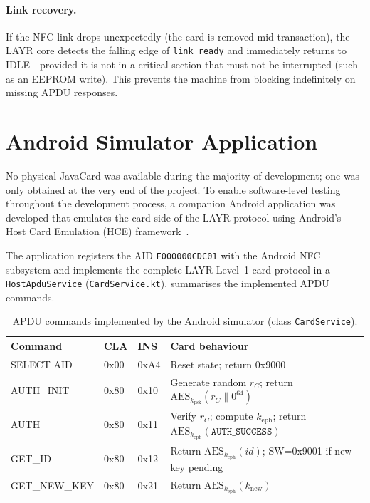 \documentclass[manuscript,screen,nonacm]{acmart}
\begin{document}
\paragraph{Link recovery.}
If the NFC link drops unexpectedly (the card is removed mid-transaction),
the LAYR core detects the falling edge of \texttt{link\_ready}
and immediately returns to IDLE—provided it is not in a critical
section that must not be interrupted (such as an EEPROM write).
This prevents the machine from blocking indefinitely on missing APDU
responses.

\section{Android Simulator Application}
\label{sec:simulator}

No physical JavaCard was available during the majority of development;
one was only obtained at the very end of the project.
To enable software-level testing throughout the development process,
a companion Android application was developed that emulates the card
side of the LAYR protocol using Android's Host Card Emulation (HCE)
framework~\cite{roland2012hce}.

The application registers the AID \texttt{F000000CDC01} with the
Android NFC subsystem and implements the complete LAYR Level~1 card
protocol in a \texttt{HostApduService} (\texttt{CardService.kt}).
 summarises the implemented APDU commands.

\begin{table}[ht]
  \caption{APDU commands implemented by the Android simulator
           (class \texttt{CardService}).}
  \label{tab:apdu_impl}
  \centering
  \begin{tabular}{lllp{5cm}}
    \toprule
    Command & CLA & INS & Card behaviour \\
    \midrule
    SELECT AID   & 0x00 & 0xA4 & Reset state; return 0x9000 \\
    AUTH\_INIT   & 0x80 & 0x10 & Generate random $r_C$; return
                                  $\text{AES}_{k_\text{psk}}(r_C \| 0^{64})$ \\
    AUTH         & 0x80 & 0x11 & Verify $r_C$; compute $k_\text{eph}$;
                                  return $\text{AES}_{k_\text{eph}}(\texttt{AUTH\_SUCCESS})$ \\
    GET\_ID      & 0x80 & 0x12 & Return $\text{AES}_{k_\text{eph}}(\mathit{id})$;
                                  SW=0x9001 if new key pending \\
    GET\_NEW\_KEY& 0x80 & 0x21 & Return $\text{AES}_{k_\text{eph}}(k_\text{new})$ \\
    \bottomrule
  \end{tabular}
\end{table}
\end{document}
